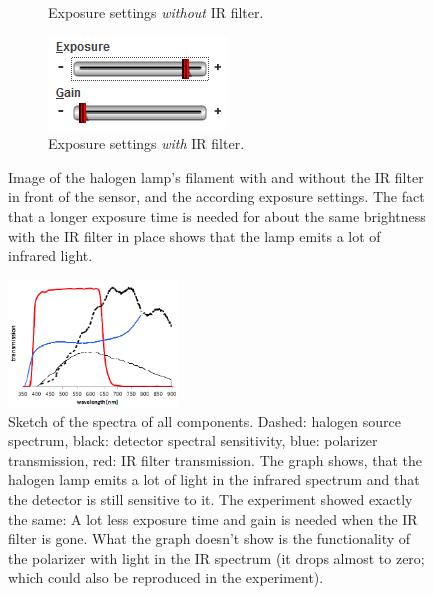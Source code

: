 \documentclass[a4paper, 12pt]{paper}
\begin{document}
\begin{figure}[H]
\begin{subfigure}[p]{0.40\textwidth}
        \caption{Exposure settings \emph{without} IR filter.}
    \end{subfigure}
    \begin{subfigure}[p]{0.40\textwidth}
        \includegraphics[width=\textwidth]{img/IR_filter}
        \caption{Exposure settings \emph{with} IR filter.}
    \end{subfigure}
    \caption{Image of the halogen lamp's filament with and without the IR filter in front of the sensor, and the according exposure settings. The fact that a longer exposure time is needed for about the same brightness with the IR filter in place shows that the lamp emits a lot of infrared light.}
\label{fig:saturation}
\end{figure}

\begin{figure}[H]
    \centering
    \includegraphics[width=0.40\textwidth]{img/transmissions}
    \caption{Sketch of the spectra of all components.
    Dashed: halogen source spectrum, black: detector spectral sensitivity, blue: polarizer transmission, red: IR filter transmission.
    The graph shows, that the halogen lamp emits a lot of light in the infrared spectrum and that the detector is still sensitive to it.
    The experiment showed exactly the same: A lot less exposure time and gain is needed when the IR filter is gone.
    What the graph doesn't show is the functionality of the polarizer with light in the IR spectrum (it drops almost to zero; which could also be reproduced in the experiment).}
\label{fig:transmissions}
\end{figure}
\end{document}
